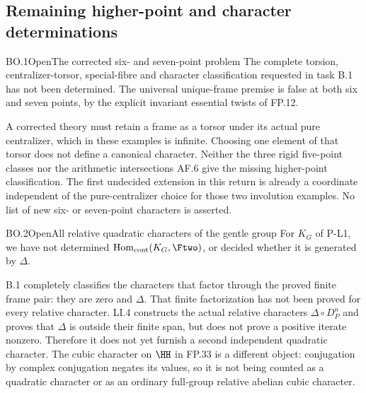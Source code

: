 \subsection{Remaining higher-point and character determinations}

\begin{statement}{BO.1}{Open}{The corrected six- and seven-point problem}
The complete torsion, centralizer-torsor, special-fibre and
character classification requested in task B.1 has not been
determined. The universal unique-frame premise is false at
both six and seven points, by the explicit invariant essential
twists of FP.12.
\end{statement}
A corrected theory must retain a frame as a torsor under its
actual pure centralizer, which in these examples is infinite.
Choosing one element of that torsor does not define a canonical
character. Neither the three rigid five-point classes nor the
arithmetic intersections AF.6 give the missing higher-point
classification. The first undecided extension in this return
is already a coordinate independent of the pure-centralizer
choice for those two involution examples. No list of new
six- or seven-point characters is asserted.

\begin{statement}{BO.2}{Open}{All relative quadratic characters of the gentle group}
For $K_G$ of P-L1, we have not determined
$\operatorname{Hom}_{\rm cont}(K_G,\Ftwo)$, or decided
whether it is generated by $\Delta$.
\end{statement}
B.1 completely classifies the characters that factor through
the proved finite frame pair: they are zero and $\Delta$.
That finite factorization has not been proved for every
relative character. LI.4 constructs the actual relative
characters $\Delta\circ D_P^n$ and proves that $\Delta$
is outside their finite span, but does not prove a positive
iterate nonzero. Therefore it does not yet furnish a second
independent quadratic character. The cubic character on
$\HH$ in FP.33 is a different object: conjugation by complex
conjugation negates its values, so it is not being counted
as a quadratic character or as an ordinary full-group
relative abelian cubic character.

